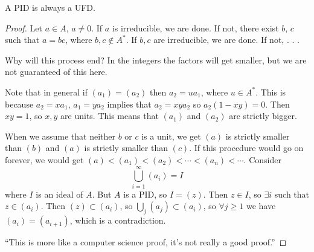 \begin{theorem}
A PID is always a UFD.
\end{theorem}
\begin{proof}
Let $a \in A$, $a \neq 0$. If $a$ is irreducible, we are done. If not,
there exist $b$, $c$ such that $a = bc$, where $b, c \notin
A^\ast$. If $b, c$ are irreducible, we are done. If not, . . .

Why will this process end? In the integers the factors will get
smaller, but we are not guaranteed of this here.

Note that in general if $(a_1) = (a_2)$ then $a_2 = u a_1$, where
$u \in A^\ast$. This is because $a_2 = x a_1$, $a_1 = y a_2$ implies
that $a_2 = xya_2$ so $a_2(1 - xy) = 0$. Then $xy = 1$, so $x, y$ are
units. This means that $(a_1)$ and $(a_2)$ are strictly bigger.

When we assume that neither $b$ or $c$ is a unit, we get
$(a)$ is strictly smaller than $(b)$ and $(a)$ is strictly smaller
than $(c)$. If this procedure would go on forever, we would get
$(a) < (a_1) < (a_2) < \cdots < (a_n) < \cdots$. Consider
$$
\bigcup_{i=1}^\infty (a_i) = I
$$
where $I$ is an ideal of $A$. But $A$ is a PID, so $I = (z)$.
Then $z \in I$, so $\exists i$ such that $z \in (a_i)$.
Then $(z) \subset (a_i)$, so $\bigcup_j (a_j) \subset (a_i)$, so
$\forall j \geq 1$ we have $(a_i) = (a_{i+1})$, which is a
contradiction.

``This is more like a computer science proof, it's not really a good proof.''
\end{proof}
